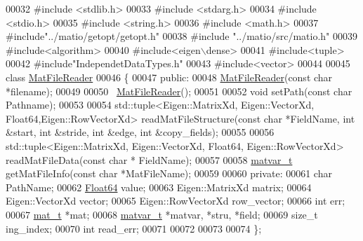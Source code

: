 \begin{DoxyCode}
00032 \textcolor{preprocessor}{#include <stdlib.h>}
00033 \textcolor{preprocessor}{#include <stdarg.h>}
00034 \textcolor{preprocessor}{#include <stdio.h>}
00035 \textcolor{preprocessor}{#include <string.h>}
00036 \textcolor{preprocessor}{#include <math.h>}
00037 \textcolor{preprocessor}{#include"../matio/getopt/getopt.h"}
00038 \textcolor{preprocessor}{#include "../matio/src/matio.h"}
00039 \textcolor{preprocessor}{#include<algorithm>}
00040 \textcolor{preprocessor}{#include<eigen\(\backslash\)dense>}
00041 \textcolor{preprocessor}{#include<tuple>}
00042 \textcolor{preprocessor}{#include"IndependetDataTypes.h"}
00043 \textcolor{preprocessor}{#include<vector>}
00044 
00045 \textcolor{keyword}{class }\hyperlink{class_mat_file_reader}{MatFileReader}
00046 \{
00047 \textcolor{keyword}{public}:
00048     \hyperlink{class_mat_file_reader}{MatFileReader}(\textcolor{keyword}{const} \textcolor{keywordtype}{char} *filename);
00049 
00050     ~\hyperlink{class_mat_file_reader}{MatFileReader}();
00051 
00052     \textcolor{keywordtype}{void} setPath(\textcolor{keyword}{const} \textcolor{keywordtype}{char} Pathname);
00053 
00054     std::tuple<Eigen::MatrixXd, Eigen::VectorXd, Float64,Eigen::RowVectorXd> readMatFileStructure(\textcolor{keyword}{const} \textcolor{keywordtype}{
      char} *FieldName, \textcolor{keywordtype}{int} &start, \textcolor{keywordtype}{int} &stride, \textcolor{keywordtype}{int} &edge, \textcolor{keywordtype}{int} &copy\_fields);
00055 
00056     std::tuple<Eigen::MatrixXd, Eigen::VectorXd, Float64, Eigen::RowVectorXd> readMatFileData(\textcolor{keyword}{const} \textcolor{keywordtype}{char} *
      FieldName);
00057 
00058     \hyperlink{group___m_a_t_structmatvar__t}{matvar\_t} getMatFileInfo(\textcolor{keyword}{const} \textcolor{keywordtype}{char} *MatFileName);
00059 
00060 \textcolor{keyword}{private}:
00061     \textcolor{keywordtype}{char} PathName;
00062     \hyperlink{group___tools_ga3f1431cb9f76da10f59246d1d743dc2c}{Float64} value;
00063     Eigen::MatrixXd matrix;
00064     Eigen::VectorXd vector;
00065     Eigen::RowVectorXd row\_vector;
00066     \textcolor{keywordtype}{int}   err;
00067     \hyperlink{struct__mat__t}{mat\_t}    *mat;
00068     \hyperlink{group___m_a_t_structmatvar__t}{matvar\_t} *matvar, *stru, *field;
00069     \textcolor{keywordtype}{size\_t} ing\_index;
00070     \textcolor{keywordtype}{int} read\_err;
00071 
00072 
00073 
00074 \};
\end{DoxyCode}
